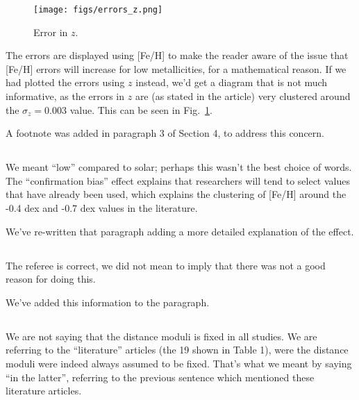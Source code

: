 \documentclass{article}
\begin{document}
\begin{figure}
    \centering
    \texttt{[image: figs/errors\_z.png]}
    \caption{Error in $z$.}
    \label{fig:errors_z}
\end{figure}

The errors are displayed using [Fe/H] to make the reader aware of the issue
that [Fe/H] errors will increase for low metallicities, for a mathematical
reason.
If we had plotted the errors using $z$ instead, we'd get a diagram that is not
much informative, as the errors in $z$ are (as stated in the article) very
clustered around the $\sigma_{z}{=}0.003$ value. This can be seen in
Fig.~\ref{fig:errors_z}.

A footnote was added in paragraph 3 of Section 4, to address this concern.


\subsection{}

We meant ``low'' compared to solar; perhaps this wasn't the best choice of
words. The ``confirmation bias'' effect explains that researchers will tend
to select values that have already been used, which explains the clustering of 
[Fe/H] around the -0.4 dex and -0.7 dex values in the literature.

We've re-written that paragraph adding a more detailed explanation of the
effect.

\subsection{}
The referee is correct, we did not mean to imply that there was not a good
reason for doing this.

We've added this information to the paragraph.

\subsection{}
We are not saying that the distance moduli is fixed in all studies. We
are referring to the ``literature'' articles (the 19 shown in Table 1), were the
distance moduli were indeed always assumed to be fixed.
That's what we meant by saying ``in the latter'', referring to the previous
sentence which mentioned these literature articles.
\end{document}
